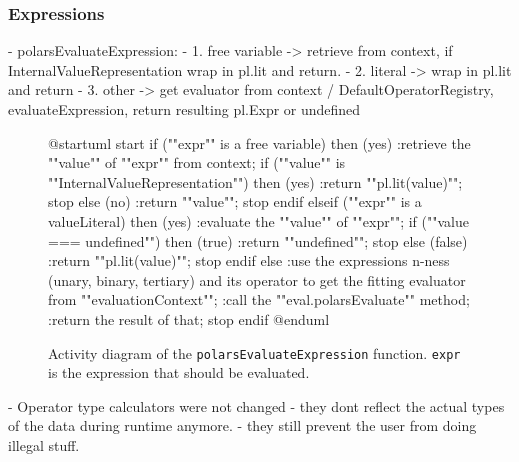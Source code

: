 \subsubsection{Expressions}
- polarsEvaluateExpression:
- 1. free variable -> retrieve from context, if InternalValueRepresentation wrap in pl.lit and return.
- 2. literal -> wrap in pl.lit and return
- 3. other -> get evaluator from context / DefaultOperatorRegistry, evaluateExpression, return resulting pl.Expr or undefined
\begin{figure}
	\begin{plantuml}
		@startuml
		start
		if (""expr"" is a free variable) then (yes)
		:retrieve the ""value"" of ""expr"" from context;
		if (""value"" is ""InternalValueRepresentation"") then (yes)
		:return ""pl.lit(value)"";
		stop
		else (no)
		:return ""value"";
		stop
		endif
		elseif (""expr"" is a valueLiteral) then (yes)
		:evaluate the ""value"" of ""expr"";
		if (""value === undefined"") then (true)
		:return ""undefined"";
		stop
		else (false)
		:return ""pl.lit(value)"";
		stop
		endif
		else
		:use the expressions n-ness (unary, binary, tertiary) and its
		operator to get the fitting evaluator from ""evaluationContext"";
		:call the ""eval.polarsEvaluate"" method;
		:return the result of that;
		stop
		endif
		@enduml
	\end{plantuml}
	\caption{
		Activity diagram of the \Verb|polarsEvaluateExpression| function.
		\Verb|expr| is the expression that should be evaluated. %
	}
	\label{fig:uml:polars_evaluate_expression}
\end{figure}





- Operator type calculators were not changed
- they dont reflect the actual types of the data during runtime anymore.
- they still prevent the user from doing illegal stuff.




